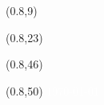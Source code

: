 \begin{frame}[plain]
\begin{textblock*}{\banderougewidth}
    \textcolor{white}{\titlefmt}
  \end{textblock*}

  \begin{textblock*}{\banderougewidth}(0.8\TPHorizModule,9\TPVertModule)
    \textcolor{white}{\subtitlefmt}
  \end{textblock*}
  
  \begin{textblock*}{\textwidth}(0.8\TPHorizModule,23\TPVertModule)
    \textcolor{white}{\authorfmt}
  \end{textblock*}

  
  \begin{textblock*}{\textwidth}(0.8\TPHorizModule,46\TPVertModule)
    \textcolor{white}{\sigle}
  \end{textblock*}
  
  \begin{textblock*}{\textwidth}(0.8\TPHorizModule,50\TPVertModule)
    \textcolor{white}{\today}
  \end{textblock*}
\end{frame}